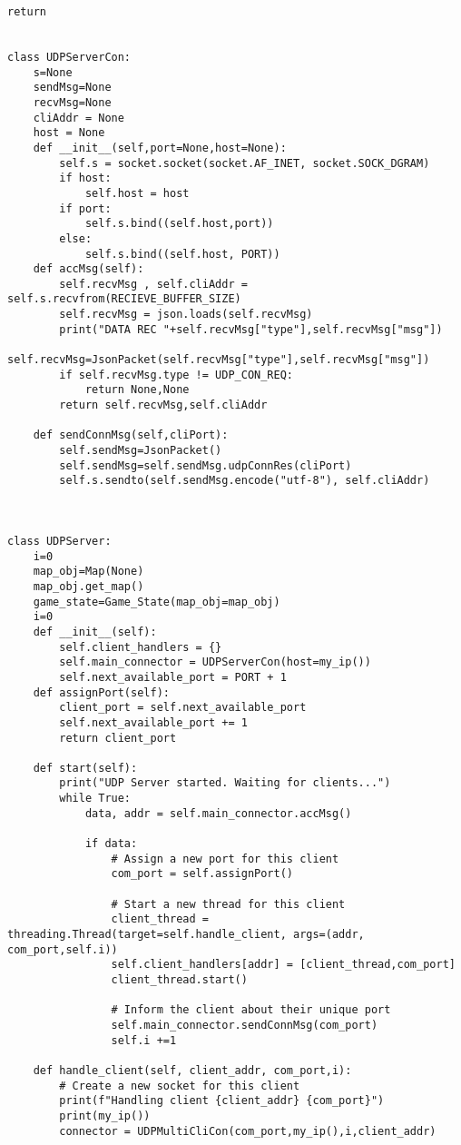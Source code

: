 \begin{lstlisting}[style=pythonstyle, caption=server code UDP]
        return


class UDPServerCon:
    s=None
    sendMsg=None
    recvMsg=None
    cliAddr = None
    host = None
    def __init__(self,port=None,host=None):
        self.s = socket.socket(socket.AF_INET, socket.SOCK_DGRAM)
        if host:
            self.host = host
        if port:
            self.s.bind((self.host,port))
        else:
            self.s.bind((self.host, PORT))
    def accMsg(self):
        self.recvMsg , self.cliAddr = self.s.recvfrom(RECIEVE_BUFFER_SIZE)
        self.recvMsg = json.loads(self.recvMsg)
        print("DATA REC "+self.recvMsg["type"],self.recvMsg["msg"])
        self.recvMsg=JsonPacket(self.recvMsg["type"],self.recvMsg["msg"])
        if self.recvMsg.type != UDP_CON_REQ:
            return None,None
        return self.recvMsg,self.cliAddr

    def sendConnMsg(self,cliPort):
        self.sendMsg=JsonPacket()
        self.sendMsg=self.sendMsg.udpConnRes(cliPort)
        self.s.sendto(self.sendMsg.encode("utf-8"), self.cliAddr)



class UDPServer:
    i=0
    map_obj=Map(None)
    map_obj.get_map()
    game_state=Game_State(map_obj=map_obj)
    i=0
    def __init__(self):
        self.client_handlers = {}
        self.main_connector = UDPServerCon(host=my_ip())
        self.next_available_port = PORT + 1
    def assignPort(self):
        client_port = self.next_available_port
        self.next_available_port += 1
        return client_port

    def start(self):
        print("UDP Server started. Waiting for clients...")
        while True:
            data, addr = self.main_connector.accMsg()

            if data:
                # Assign a new port for this client
                com_port = self.assignPort()
                
                # Start a new thread for this client
                client_thread = threading.Thread(target=self.handle_client, args=(addr, com_port,self.i))
                self.client_handlers[addr] = [client_thread,com_port]
                client_thread.start()
                
                # Inform the client about their unique port
                self.main_connector.sendConnMsg(com_port)
                self.i +=1        

    def handle_client(self, client_addr, com_port,i):
        # Create a new socket for this client
        print(f"Handling client {client_addr} {com_port}")
        print(my_ip())
        connector = UDPMultiCliCon(com_port,my_ip(),i,client_addr)
        


\end{lstlisting}
